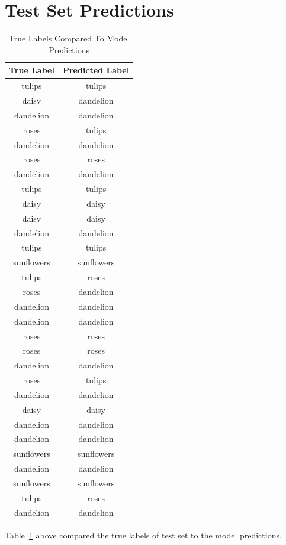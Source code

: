 \documentclass{article}
\begin{document}
\section*{Test Set Predictions}
\begin{table}[H]
    \centering
    \caption{True Labels Compared To Model Predictions}
    \begin{tabular}{|c|c|}
        \hline
        \textbf{True Label} & \textbf{Predicted Label} \\
        \hline
        tulips      & tulips      \\
        daisy       & dandelion   \\
        dandelion   & dandelion   \\
        roses       & tulips      \\
        dandelion   & dandelion   \\
        roses       & roses       \\
        dandelion   & dandelion   \\
        tulips      & tulips      \\
        daisy       & daisy       \\
        daisy       & daisy       \\
        dandelion   & dandelion   \\
        tulips      & tulips      \\
        sunflowers  & sunflowers  \\
        tulips      & roses       \\
        roses       & dandelion   \\
        dandelion   & dandelion   \\
        dandelion   & dandelion   \\
        roses       & roses       \\
        roses       & roses       \\
        dandelion   & dandelion   \\
        roses       & tulips      \\
        dandelion   & dandelion   \\
        daisy       & daisy       \\
        dandelion   & dandelion   \\
        dandelion   & dandelion   \\
        sunflowers  & sunflowers  \\
        dandelion   & dandelion   \\
        sunflowers  & sunflowers  \\
        tulips      & roses       \\
        dandelion   & dandelion   \\
        \hline
    \end{tabular}
    \label{tab:predictions}
\end{table}
Table~\ref{tab:predictions} above compared the true labels of test set to the model predictions.
\end{document}
